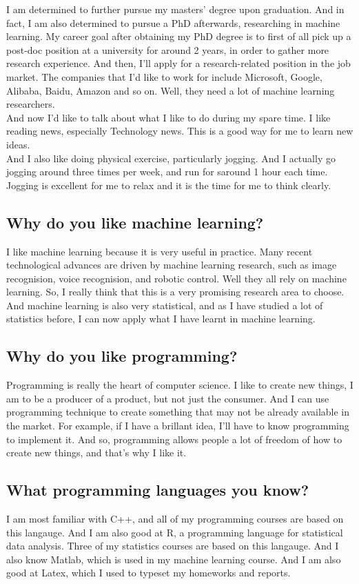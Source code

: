 \documentclass[12pt, landscape]{article}
\begin{document}
\begin{multicols}{2}
I am determined to further pursue my masters' degree upon graduation. And in fact, I am also determined to pursue a PhD afterwards, researching in machine learning. My career goal after obtaining my PhD degree is to first of all pick up a post-doc position at a university for around 2 years, in order to gather more research experience. And then, I'll apply for a research-related position in the job market. The companies that I'd like to work for include Microsoft, Google, Alibaba, Baidu, Amazon and so on. Well, they need a lot of machine learning researchers.\\

And now I'd like to talk about what I like to do during my spare time. I like reading news, especially Technology news. This is a good way for me to learn new ideas.\\

And I also like doing physical exercise, particularly jogging. And I actually go jogging around three times per week, and run for saround 1 hour each time. Jogging is excellent for me to relax and it is the time for me to think clearly.

\subsection{Why do you like machine learning?}
I like machine learning because it is very useful in practice. Many recent technological advances are driven by machine learning research, such as image recognision, voice recognision, and robotic control. Well they all rely on machine learning. So, I really think that this is a very promising research area to choose. And machine learning is also very statistical, and as I have studied a lot of statistics before, I can now apply what I have learnt in machine learning.

\subsection{Why do you like programming?}
Programming is really the heart of computer science. I like to create new things, I am to be a producer of a product, but not just the consumer. And I can use programming technique to create something that may not be already available in the market. For example, if I have a brillant idea, I'll have to know programming to implement it. And so, programming allows people a lot of freedom of how to create new things, and that's why I like it.

\subsection{What programming languages you know?}
I am most familiar with C++, and all of my programming courses are based on this langauge. And I am also good at R, a programming language for statistical data analysis. Three of my statistics courses are based on this langauge. And I also know Matlab, which is used in my machine learning course. And I am also good at Latex, which I used to typeset my homeworks and reports. \\



\end{multicols}
\end{document}

